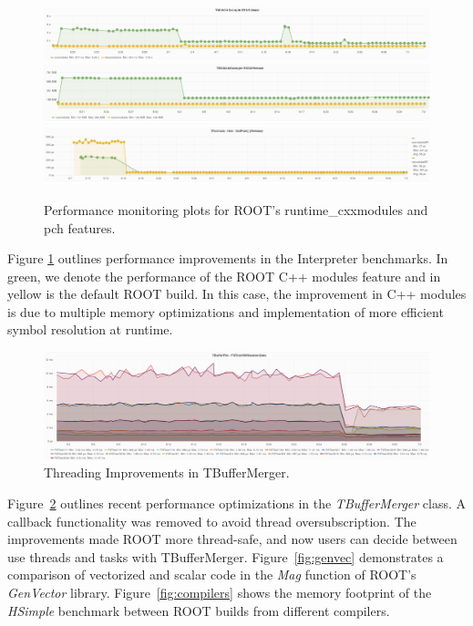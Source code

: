 \documentclass{webofc}
\begin{document}
\begin{figure}[h]
\centering
\includegraphics[width=\linewidth]{pictures/1.png}
\includegraphics[width=\linewidth]{pictures/2.png}
\includegraphics[width=\linewidth]{pictures/4.png}
\caption{Performance monitoring plots for ROOT's runtime\_cxxmodules and pch features.}
\label{interp}
\end{figure}

Figure \ref{interp} outlines performance improvements in the Interpreter benchmarks. In green, we denote the performance of the ROOT C++ modules feature \cite{modules} and in yellow is the default ROOT build. In this case, the improvement in C++ modules is due to multiple memory optimizations and implementation of more efficient symbol resolution at runtime.

\begin{figure}[h]
\centering
\includegraphics[width=\linewidth]{pictures/5.png}
\caption{Threading Improvements in TBufferMerger.}
\label{tbuf}
\end{figure}

Figure~\ref{tbuf} outlines recent performance optimizations in the \textit{TBufferMerger} class. A callback functionality was removed to avoid thread oversubscription. The improvements made ROOT more thread-safe, and now users can decide between use threads and tasks with TBufferMerger. Figure~\ref{fig:genvec} demonstrates a comparison of vectorized and scalar code in the \textit{Mag} function of ROOT's \textit{GenVector} library. Figure~\ref{fig:compilers} shows the memory footprint of the \textit{HSimple} benchmark between ROOT builds from different compilers.
\end{document}
